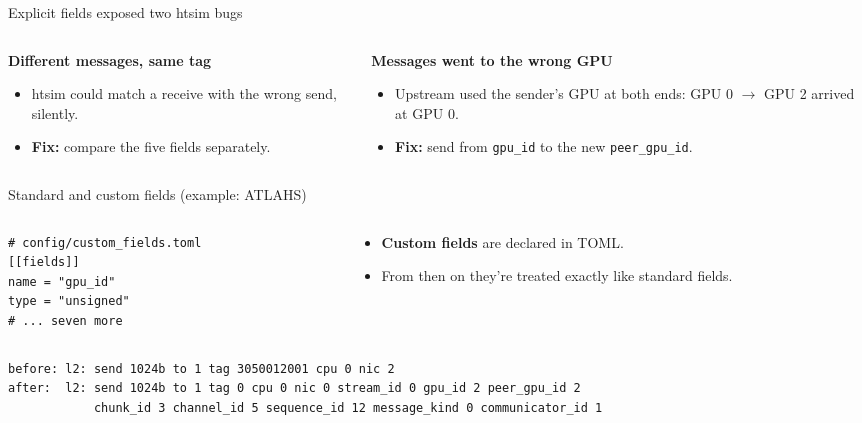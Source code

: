 \documentclass[aspectratio=169,11pt]{beamer}
\begin{document}
\begin{frame}{Explicit fields exposed two htsim bugs}
\begin{columns}[T]
\begin{column}{0.48\textwidth}
\textbf{Different messages, same tag}\par\vspace{2mm}
\parbox[c][0.38\textheight][c]{\linewidth}{\centering\resizebox{\linewidth}{!}{}}
\vspace{2mm}
\small
\begin{itemize}
\item htsim could match a receive with the wrong send, silently.
\item \textbf{Fix:} compare the five fields separately.
\end{itemize}
\end{column}
\begin{column}{0.48\textwidth}
\textbf{Messages went to the wrong GPU}\par\vspace{2mm}
\parbox[c][0.38\textheight][c]{\linewidth}{\centering\resizebox{!}{0.36\textheight}{}}
\vspace{2mm}
\small
\begin{itemize}
\item Upstream used the sender's GPU at both ends: GPU 0 $\to$ GPU 2 arrived at GPU 0.
\item \textbf{Fix:} send from \texttt{gpu\_id} to the new \texttt{peer\_gpu\_id}.
\end{itemize}
\end{column}
\end{columns}
\end{frame}

\begin{frame}[fragile]{Standard and custom fields (example: ATLAHS)}
\begin{columns}[T]
\begin{column}{0.44\textwidth}
\begin{lstlisting}
# config/custom_fields.toml
[[fields]]
name = "gpu_id"
type = "unsigned"
# ... seven more
\end{lstlisting}
\end{column}
\begin{column}{0.54\textwidth}
\begin{itemize}
\item \textbf{Custom fields} are declared in TOML.
\item From then on they're treated exactly like standard fields.
\end{itemize}
\end{column}
\end{columns}
\vspace{5mm}
\begin{lstlisting}
before: l2: send 1024b to 1 tag 3050012001 cpu 0 nic 2
after:  l2: send 1024b to 1 tag 0 cpu 0 nic 0 stream_id 0 gpu_id 2 peer_gpu_id 2
            chunk_id 3 channel_id 5 sequence_id 12 message_kind 0 communicator_id 1
\end{lstlisting}
\end{frame}
\end{document}
